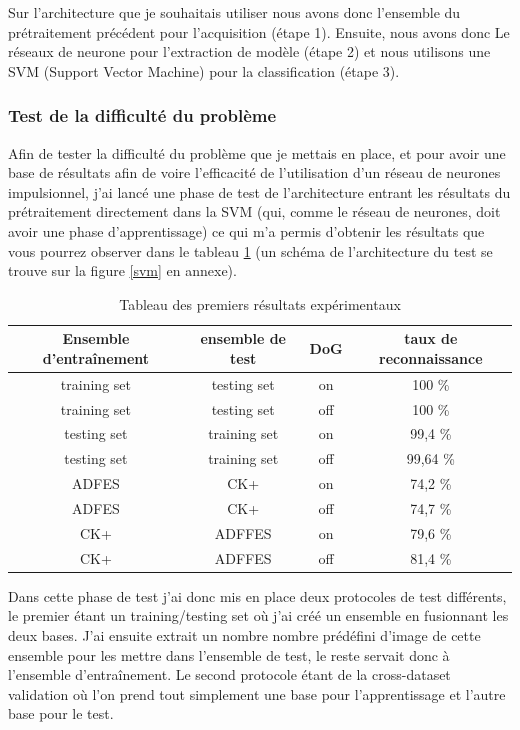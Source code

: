 \documentclass[12pt]{article}
\newcommand{\benjamin}[1]{\textcolor{red}{#1}}
\begin{document}
Sur l'architecture que je souhaitais utiliser nous avons donc l'ensemble du prétraitement précédent pour l'acquisition (étape 1). Ensuite, nous avons donc Le réseaux de neurone pour l'extraction de modèle (étape 2) et nous utilisons une SVM (Support Vector Machine) pour la classification (étape 3). 

\subsubsection{Test de la difficulté du problème}

Afin de tester la difficulté du problème que je mettais en place, et pour avoir une base de résultats afin de voire l'efficacité de l'utilisation d'un réseau de neurones impulsionnel, j'ai lancé une phase de test de l'architecture entrant les résultats du prétraitement directement dans la SVM (qui, comme le réseau de neurones, doit avoir une phase d'apprentissage) ce qui m'a permis d'obtenir les résultats que vous pourrez observer dans le tableau \ref{res} (un schéma de l'architecture du test se trouve sur la figure \ref{svm} en annexe). %

\begin{table}
\begin{tabular}{|c|c|c|c|}
\hline Ensemble d’entraînement & ensemble de test & DoG & taux de reconnaissance \\
\hline training set & testing set & on & 100 \% \\
training set & testing set & off & 100 \% \\
testing set & training set & on & 99,4 \% \\
testing set & training set & off & 99,64 \% \\ \hline\hline
ADFES & CK+ & on & 74,2 \% \\
ADFES & CK+ & off & 74,7 \% \\
CK+ & ADFFES & on & 79,6 \%\\
CK+ & ADFFES & off & 81,4 \%\\ \hline
\end{tabular}
\caption{Tableau des premiers résultats expérimentaux}
\label{res}
\end{table}

Dans cette phase de test j'ai donc mis en place deux protocoles de test différents, le premier étant un training/testing set où j'ai créé un ensemble en fusionnant les deux bases. J'ai ensuite extrait un nombre nombre prédéfini d'image de cette ensemble pour les mettre dans l'ensemble de test, le reste servait donc à l'ensemble d’entraînement. Le second protocole étant de la cross-dataset validation où l'on prend tout simplement une base pour l'apprentissage et l'autre base pour le test.
\end{document}
